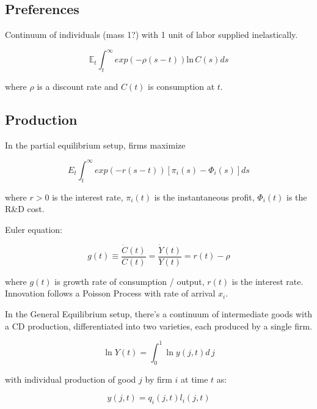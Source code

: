 \documentclass[11pt]{article}
\begin{document}
\subsection{Preferences}
\label{sub:preferences}

  Continuum of individuals (mass 1?) with 1 unit of labor supplied inelastically.

  \begin{equation} \label{eq:pref}
    \mathbb{E}_t \int_t^\infty exp(-\rho(s - t))\mathrm{ln}\,   C(s)ds
  \end{equation}

  where $\rho$ is a discount rate and $C(t)$ is consumption at $t$.

\subsection{Production}
\label{sub:production}

  In the partial equilibrium setup, firms maximize

  \begin{equation}
    E_t \int_t^\infty exp(-r(s - t))[\pi_i(s) - \Phi_i(s)]ds
  \end{equation}

  where $r > 0$ is the interest rate, $\pi_i(t)$ is the instantaneous profit, $\Phi_i(t)$ is the R\&D cost.

  Euler equation:

  \begin{equation}
    g(t) \equiv \frac{\dot{C}(t)}{C(t)} = \frac{\dot{Y}(t)}{Y(t)} = r(t) - \rho
  \end{equation}

  where $g(t)$ is growth rate of consumption / output, $r(t)$ is the interest rate.
  Innovation follows a Poisson Process with rate of arrival $x_i$.

  In the General Equilibrium setup, there's a continuum of intermediate goods with a CD production, differentiated into two varieties, each produced by a single firm.

  \begin{equation} \label{eq:tech_output}
    \ln Y(t) = \int_{0}^{1} \ln y(j, t) d\,j 
  \end{equation}

  with individual production of good $j$ by firm $i$ at time $t$ as:

  \begin{equation}
    y(j, t) = q_i(j, t)l_i(j, t)
  \end{equation}
\end{document}
